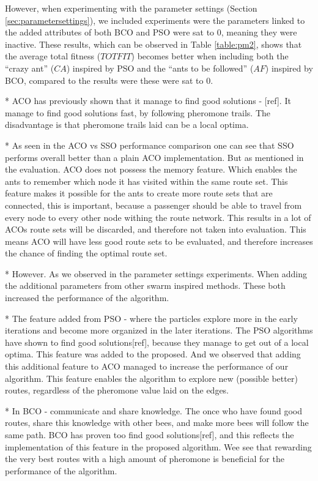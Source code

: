 \begin{enumerate}[label=\textbf{\arabic*})]
\begin{enumerate}
    However, when experimenting with the parameter settings (Section \vref{sec:parametersettings}), we included experiments were the parameters linked to the added attributes of both BCO and PSO were sat to 0, meaning they were inactive. These results, which can be observed in Table \vref{table:pm2}, shows that the average total fitness ($TOTFIT$) becomes better when including both the ``crazy ant'' ($CA$) inspired by PSO and the ``ants to be followed'' ($AF$) inspired by BCO, compared to the results were these were sat to 0.  

    * ACO has previously shown that it manage to find good solutions - [ref]. It manage to find good solutions fast, by following pheromone trails. The disadvantage is that pheromone trails laid can be a local optima.
    
    * As seen in the ACO vs SSO performance comparison one can see that SSO performs overall better than a plain ACO implementation. But as mentioned in the evaluation. ACO does not possess the memory feature. Which enables the ants to remember which node it has visited within the same route set. This feature makes it possible for the ants to create more route sets that are connected, this is important, because a passenger should be able to travel from every node to every other node withing the route network. This results in a lot of ACOs route sets will be discarded, and therefore not taken into evaluation. This means ACO will have less good route sets to be evaluated, and therefore increases the chance of finding the optimal route set. 

    * However. As we observed in the parameter settings experiments. When adding the additional parameters from other swarm inspired methods. These both increased the performance of the algorithm. 

    * The feature added from PSO - where the particles explore more in the early iterations and become more organized in the later iterations. The PSO algorithms have shown to find good solutions[ref], because they manage to get out of a local optima. This feature was added to the proposed. And we observed that adding this additional feature to ACO managed to increase the performance of our algorithm. This feature enables the algorithm to explore new (possible better) routes, regardless of the pheromone value laid on the edges.

    * In BCO - communicate and share knowledge. The once who have found good routes, share this knowledge with other bees, and make more bees will follow the same path. BCO has proven too find good solutions[ref], and this reflects the implementation of this feature in the proposed algorithm. Wee see that rewarding the very best routes with a high amount of pheromone is beneficial for the performance of the algorithm. 


\end{enumerate}
\end{enumerate}

